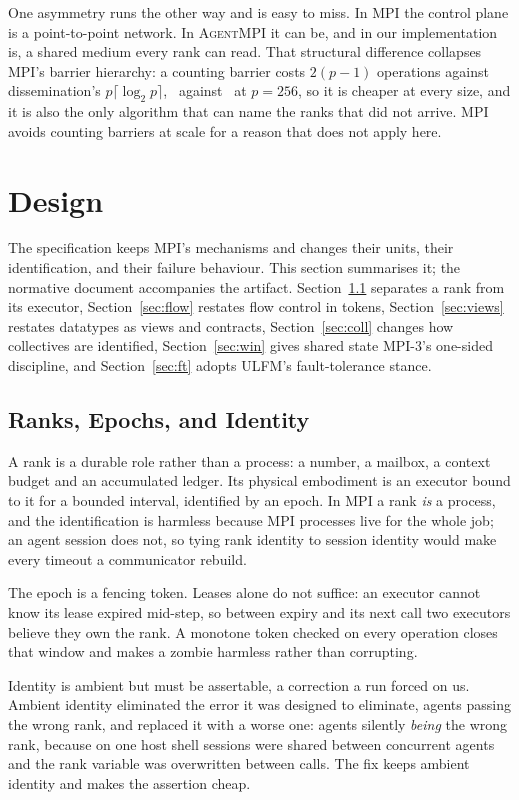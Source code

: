 \documentclass[sigconf,nonacm]{acmart}
\newcommand{\ampi}{\textsc{AgentMPI}\xspace}
\begin{document}
One asymmetry runs the other way and is easy to miss. In MPI the control plane is
a point-to-point network. In \ampi it can be, and in our implementation is, a
shared medium every rank can read. That structural difference collapses MPI's
barrier hierarchy: a counting barrier costs $2(p{-}1)$ operations against
dissemination's $p\lceil\log_2 p\rceil$, \barCentraltwofiftysix\ against
\barDissemtwofiftysix\ at $p=256$, so it is cheaper at every size, and it is
also the only algorithm that can name the ranks that did not arrive. MPI avoids
counting barriers at scale for a reason that does not apply here.

\section{Design}
\label{sec:design}

The specification keeps MPI's mechanisms and changes their units, their
identification, and their failure behaviour. This section summarises it; the
normative document accompanies the artifact. Section~\ref{sec:ranks} separates a
rank from its executor, Section~\ref{sec:flow} restates flow control in tokens,
Section~\ref{sec:views} restates datatypes as views and contracts,
Section~\ref{sec:coll} changes how collectives are identified,
Section~\ref{sec:win} gives shared state MPI-3's one-sided discipline, and
Section~\ref{sec:ft} adopts ULFM's fault-tolerance stance.

\subsection{Ranks, Epochs, and Identity}
\label{sec:ranks}

A rank is a durable role rather than a process: a number, a mailbox, a context
budget and an accumulated ledger. Its physical embodiment is an executor bound to
it for a bounded interval, identified by an epoch. In MPI a rank \emph{is} a
process, and the identification is harmless because MPI processes live for the
whole job; an agent session does not, so tying rank identity to session identity
would make every timeout a communicator rebuild.

The epoch is a fencing token. Leases alone do not suffice: an executor cannot
know its lease expired mid-step, so between expiry and its next call two
executors believe they own the rank. A monotone token checked on every operation
closes that window and makes a zombie harmless rather than corrupting.

Identity is ambient but must be assertable, a correction a run forced on us.
Ambient identity eliminated the error it was designed to eliminate, agents
passing the wrong rank, and replaced it with a worse one: agents silently
\emph{being} the wrong rank, because on one host shell sessions were shared
between concurrent agents and the rank variable was overwritten between calls.
The fix keeps ambient identity and makes the assertion cheap.
\end{document}
